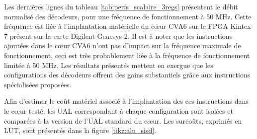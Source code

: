 \documentclass[../main.tex]{subfiles}
\begin{document}
Les dernières lignes du tableau \ref{tab:perfs_scalaire_3regs} présentent le débit normalisé des décodeurs, pour une fréquence de fonctionnement à 50 MHz. 
Cette fréquence est liée à l'implantation matérielle du cœur CVA6 sur le FPGA Kintex-7 présent sur la carte Digilent Genesys 2.
Il est à noter que les instructions ajoutées dans le cœur CVA6 n'ont pas d'impact sur la fréquence maximale de fonctionnement, ceci est très probablement liée à la fréquence de fonctionnement limitée à 50 MHz.
Les résultats présentés mettent en exergue que les configurations  des décodeurs offrent des gains substantiels grâce aux instructions spécialisées proposées.

Afin d'estimer le coût matériel associé à l'implantation des ces instructions dans le cœur testé, les UAL correspondant à chaque configuration sont isolées et comparées à la version de l'UAL standard du cœur.
Les surcoûts, exprimés en LUT, sont présentés dans la figure \ref{tikz:alu_sisd}.
\end{document}
